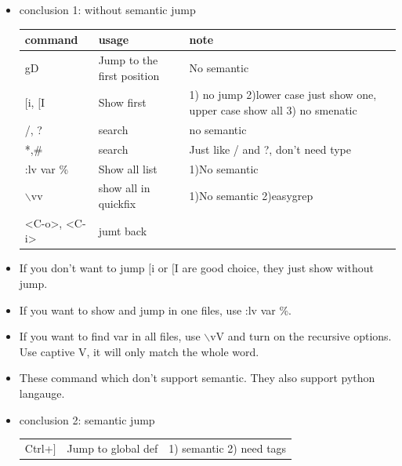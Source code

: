 \documentclass[a4paper,11pt,twoside]{book}
\begin{document}
\begin{itemize}
		\item conclusion 1: without semantic jump
\begin{center}
		\begin{tabular}{p{}|p{}|p{}}
		\hline
		command & usage & note\\

   	    \hline 
		gD & Jump to the first position & No semantic  \\
	
		\hline 
		$[$i, $[$I & Show first & 1) no jump 2)lower case just show one, upper case show all  3) no smenatic\\
	
		\hline 
		/, ? & search & no semantic  \\
		
		\hline 
		*,\# & search & Just like / and ?, don't need type  \\

		\hline 
		:lv var \% & Show all list & 1)No semantic  \\
		
		\hline 
		$\backslash$vv & show all in quickfix & 1)No semantic 2)easygrep\\

              \hline
	   <C-o>, <C-i> & jumt back &  \\


	\end{tabular}
\end{center}
	
	\item If you don't want to jump $[$i or $[$I are good choice, they just show without jump.

	\item If you want to show and jump in one files, use :lv var \%. 

	\item If you want to find var in all files, use $\backslash$vV and turn on the recursive options. Use captive V, it will only match the whole word.

	\item These command which don't support semantic. They also support python langauge. 

		\item conclusion 2: semantic jump
\begin{center}
		\begin{tabular}{p{}|p{}|p{}}
		\hline 
		Ctrl+$]$ &Jump to global def & 1) semantic 2) need tags \\


\end{tabular}
\end{center}
\end{itemize}
\end{document}
